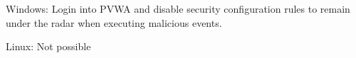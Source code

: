 Windows:
Login into PVWA and disable security configuration rules to remain under the radar when executing malicious events.

Linux: Not possible